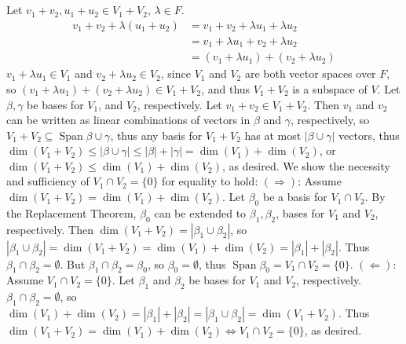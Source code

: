 \documentclass[11pt]{article}
\DeclareMathOperator{\Span}{Span}
\begin{document}
\section{} %
Let $v_1+v_2,u_1+u_2\in V_1+V_2$, $\lambda\in F$.
\newline
\newline
\begin{align*}
	v_1+v_2+\lambda(u_1+u_2)&=v_1+v_2+\lambda u_1+\lambda u_2\\
	&=v_1+\lambda u_1+v_2+\lambda u_2\\
	&=(v_1+\lambda u_1)+(v_2+\lambda u_2)
\end{align*}
$v_1+\lambda u_1\in V_1$ and $v_2+\lambda u_2\in V_2$, since $V_1$ and $V_2$
are both vector spaces over $F$, so
$(v_1+\lambda u_1)+(v_2+\lambda u_2)\in V_1+V_2$, and thus $V_1+V_2$ is a
subspace of $V$.
\newline
\newline
Let $\beta,\gamma$ be bases for $V_1$, and $V_2$, respectively. Let
$v_1+v_2\in V_1+V_2$. Then $v_1$ and $v_2$ can be written as linear
combinations of vectors in $\beta$ and $\gamma$, respectively, so
$V_1+V_2\subseteq\Span\beta\cup\gamma$, thus any basis for $V_1+V_2$ has at
most $|\beta\cup\gamma|$ vectors, thus
$\dim(V_1+V_2)\le|\beta\cup\gamma|\le|\beta|+|\gamma|=\dim(V_1)+\dim(V_2)$, or
$\dim(V_1+V_2)\le\dim(V_1)+\dim(V_2)$, as desired.
\newline
\newline
We show the necessity and sufficiency of $V_1\cap V_2=\{0\}$ for equality to
hold:
\newline
\newline
$(\Longrightarrow)$: Assume $\dim(V_1+V_2)=\dim(V_1)+\dim(V_2)$. Let $\beta_0$
be a basis for $V_1\cap V_2$. By the Replacement Theorem, $\beta_0$ can be
extended to $\beta_1,\beta_2$, bases for $V_1$ and $V_2$, respectively.
Then $\dim(V_1+V_2)=|\beta_1\cup\beta_2|$, so
$|\beta_1\cup\beta_2|=\dim(V_1+V_2)=\dim(V_1)+\dim(V_2)=|\beta_1|+|\beta_2|$.
Thus $\beta_1\cap\beta_2=\emptyset$. But $\beta_1\cap\beta_2=\beta_0$, so
$\beta_0=\emptyset$, thus $\Span\beta_0=V_1\cap V_2=\{0\}$.
\newline
\newline
$(\Longleftarrow)$: Assume $V_1\cap V_2=\{0\}$. Let $\beta_1$ and $\beta_2$ be
bases for $V_1$ and $V_2$, respectively. $\beta_1\cap\beta_2=\emptyset$, so
$\dim(V_1)+\dim(V_2)=|\beta_1|+|\beta_2|=|\beta_1\cup\beta_2|=\dim(V_1+V_2)$.
\newline
\newline
Thus $\dim(V_1+V_2)=\dim(V_1)+\dim(V_2)\Longleftrightarrow V_1\cap V_2=\{0\}$,
as desired.
\end{document}
